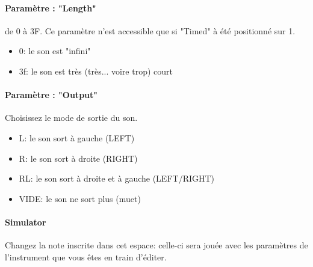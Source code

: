 \paragraph{Paramètre : "Length"} de 0 à 3F.
Ce paramètre n'est accessible que si "Timed" à été positionné sur 1.
\medskip

\begin{itemize}
    \item{0: le son est "infini"}
    \item{3f: le son est très (très... voire trop) court}
\end{itemize}

\paragraph{Paramètre : "Output"} Choisissez le mode de sortie du son.
\medskip
\begin{itemize}
    \item{L: le son sort à gauche (LEFT)}
    \item{R: le son sort à droite (RIGHT)}
    \item{RL: le son sort à droite et à gauche (LEFT/RIGHT)}
    \item{VIDE: le son ne sort plus (muet)}
\end{itemize}

\paragraph{Simulator} Changez la note inscrite dans cet espace:
            celle-ci sera jouée avec les paramètres de l'instrument que vous êtes en train d'éditer.
